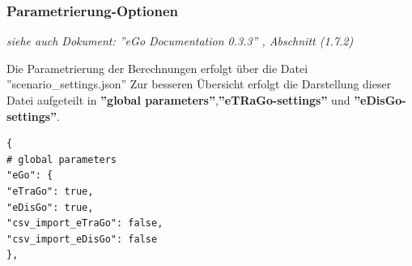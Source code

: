 \documentclass[
a4paper,     %
12pt         %
]{scrartcl}  %
\begin{document}
\subsubsection{Parametrierung-Optionen}
\label{param-opt}
\textit{siehe auch Dokument: ''eGo Documentation 0.3.3'' , Abschnitt (1.7.2)}

Die Parametrierung der Berechnungen erfolgt über die Datei ''scenario\_settings.json''
Zur besseren Übersicht erfolgt die Darstellung dieser Datei aufgeteilt in \textbf{''global parameters''},\textbf{''eTRaGo-settings''} und \textbf{''eDisGo-settings''}.
 
\begin{lstlisting}
{
# global parameters
"eGo": {
"eTraGo": true,
"eDisGo": true,
"csv_import_eTraGo": false,
"csv_import_eDisGo": false
},
\end{lstlisting}
\end{document}
